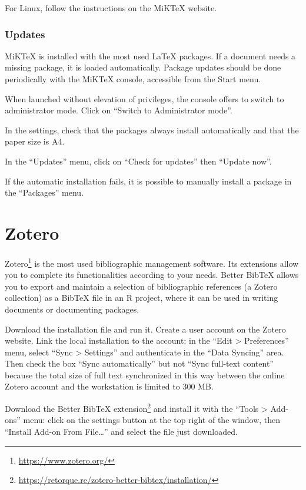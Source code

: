 \documentclass[
  12pt,
  american,
  a4paper,
  extrafontsizes,onecolumn,openright
  ]{memoir}
\begin{document}
For Linux, follow the instructions on the MiKTeX website.

\subsubsection{Updates}\label{updates}

MiKTeX is installed with the most used LaTeX packages.
If a document needs a missing package, it is loaded automatically.
Package updates should be done periodically with the MiKTeX console, accessible from the Start menu.

When launched without elevation of privileges, the console offers to switch to administrator mode.
Click on \enquote{Switch to Administrator mode}.

In the settings, check that the packages always install automatically and that the paper size is A4.

In the \enquote{Updates} menu, click on \enquote{Check for updates} then \enquote{Update now}.

If the automatic installation fails, it is possible to manually install a package in the \enquote{Packages} menu.

\section{Zotero}\label{sec:Zotero}

Zotero\footnote{\url{https://www.zotero.org/}} is the most used bibliographic management software.
Its extensions allow you to complete its functionalities according to your needs.
Better BibTeX allows you to export and maintain a selection of bibliographic references (a Zotero collection) as a BibTeX file in an R project, where it can be used in writing documents or documenting packages.

Download the installation file and run it.
Create a user account on the Zotero website.
Link the local installation to the account: in the \enquote{Edit \textgreater{} Preferences} menu, select \enquote{Sync \textgreater{} Settings} and authenticate in the \enquote{Data Syncing} area.
Then check the box \enquote{Sync automatically} but not \enquote{Sync full-text content} because the total size of full text synchronized in this way between the online Zotero account and the workstation is limited to 300 MB.

Download the Better BibTeX extension\footnote{\url{https://retorque.re/zotero-better-bibtex/installation/}} and install it with the \enquote{Tools \textgreater{} Add-ons} menu: click on the settings button at the top right of the window, then \enquote{Install Add-on From File\ldots{}} and select the file just downloaded.
\end{document}
